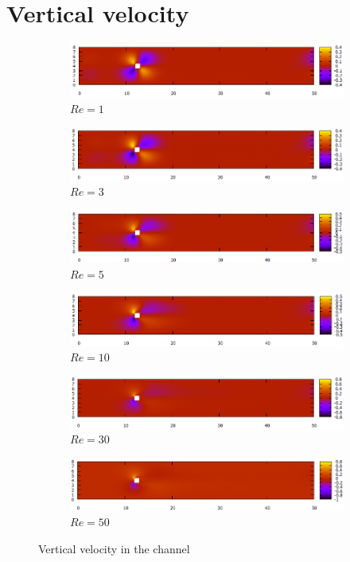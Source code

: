 \section{Vertical velocity}
\begin{figure}[H]
	\begin{subfigure}{\textwidth}
		\centering
		\includegraphics[width=.8\linewidth]{Square/totv1}
		\caption{$Re=1$}
	\end{subfigure}
	\begin{subfigure}{\textwidth}
		\centering
		\includegraphics[width=.8\linewidth]{Square/totv3}
		\caption{$Re=3$}
	\end{subfigure}
	\begin{subfigure}{\textwidth}
		\centering
		\includegraphics[width=.8\linewidth]{Square/totv5}
		\caption{$Re=5$}
	\end{subfigure}
	\begin{subfigure}{\textwidth}
		\centering
		\includegraphics[width=.8\linewidth]{Square/totv10}
		\caption{$Re=10$}
	\end{subfigure}
	\begin{subfigure}{\textwidth}
		\centering
		\includegraphics[width=.8\linewidth]{Square/totv30}
		\caption{$Re=30$}
	\end{subfigure}
	\begin{subfigure}{\textwidth}
		\centering
		\includegraphics[width=.8\linewidth]{Square/totv50}
		\caption{$Re=50$}
	\end{subfigure}
	\caption{Vertical velocity in the channel}
\end{figure}